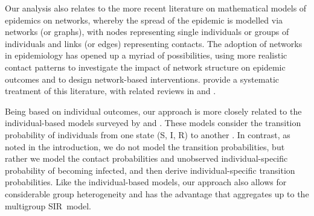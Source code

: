 \documentclass[12pt]{article}
\begin{document}
Our analysis also relates to the more recent literature on mathematical models
of epidemics on networks, whereby the spread of the epidemic is modelled via
networks (or graphs), with nodes representing single individuals or groups of
individuals and links (or edges) representing contacts. The adoption of
networks in epidemiology has opened up a myriad of possibilities, using more
realistic contact patterns to investigate the impact of network structure on
epidemic outcomes and to design network-based interventions.
\citet*{Kiss2017book}
provide a systematic treatment of this literature, with related reviews in
\cite{Miller2014review} and \cite{Pastor2015review}.

Being based on individual outcomes, our approach is more closely related to
the individual-based models surveyed by \cite{Willem2017review} and
\citet*{Nepomuceno2018survey}%
. These models consider the transition probability of individuals from one
state (S, I, R) to another
\citep{Rocha2016IBA, Gourieroux2020AES}%
. In contrast, as noted in the introduction, we do not model the transition
probabilities, but rather we model the contact probabilities and unobserved
individual-specific probability of becoming infected, and then derive
individual-specific transition probabilities. Like the individual-based
models, our approach also allows for considerable group heterogeneity and has
the advantage that aggregates up to the multigroup SIR\ model.
\end{document}
